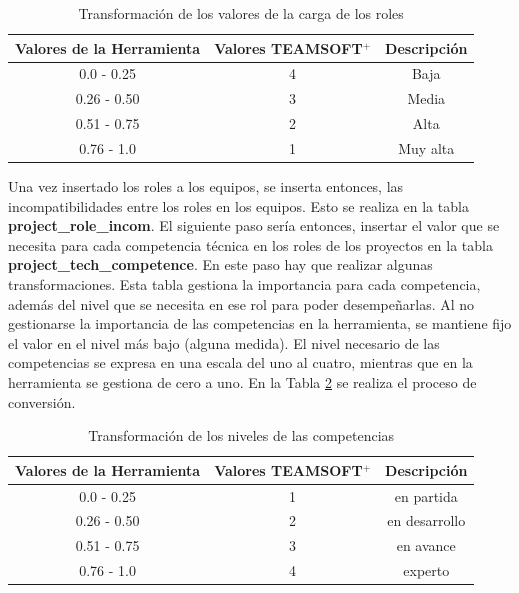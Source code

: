 \begin{table}[H]
	\centering
	\caption{Transformación de los valores de la carga de los roles}\label{table:transformacion-carga}
	\begin{tabular}{c | c | c}
		\toprule[1.7pt]
		Valores de la Herramienta & Valores TEAMSOFT$^+$ & Descripción               \\ \midrule
		        0.0 - 0.25          & 4                    & Baja                      \\ 
		        0.26 - 0.50         & 3                    & Media                     \\ 
		        0.51 - 0.75         & 2                    & Alta                      \\ 
		        0.76 - 1.0          & 1                    & Muy alta \\ \bottomrule[1.1pt]
	\end{tabular}
\end{table}

Una vez insertado los roles a los equipos, se inserta entonces, las incompatibilidades entre los roles en los equipos. Esto se realiza en la tabla \textbf{project\_role\_incom}. El siguiente paso sería entonces, insertar el valor que se necesita para cada competencia técnica en los roles de los proyectos en la tabla \textbf{project\_tech\_competence}. En este paso hay que realizar algunas transformaciones. Esta tabla gestiona la importancia para cada competencia, además del nivel que se necesita en ese rol para poder desempeñarlas. Al no gestionarse la importancia de las competencias en la herramienta, se mantiene fijo el valor en el nivel más bajo (alguna medida). El nivel necesario de las competencias se expresa en una escala del uno al cuatro, mientras que en la herramienta se gestiona de cero a uno. En la Tabla \ref{table:transformacion-nivel-competencia} se realiza el proceso de conversión.

\begin{table}[H]
	\centering
	\caption{Transformación de los niveles de las competencias}\label{table:transformacion-nivel-competencia}
	\begin{tabular}{c | c | c}
		\toprule[1.7pt]
		Valores de la Herramienta & Valores TEAMSOFT$^+$ & Descripción               \\ \midrule
		0.0 - 0.25          & 1                    & en partida                      \\ 
		0.26 - 0.50         & 2                    & en desarrollo                     \\ 
		0.51 - 0.75         & 3                    & en avance               \\ 
		0.76 - 1.0          & 4                    & experto \\ \bottomrule[1pt]
	\end{tabular}
\end{table}

